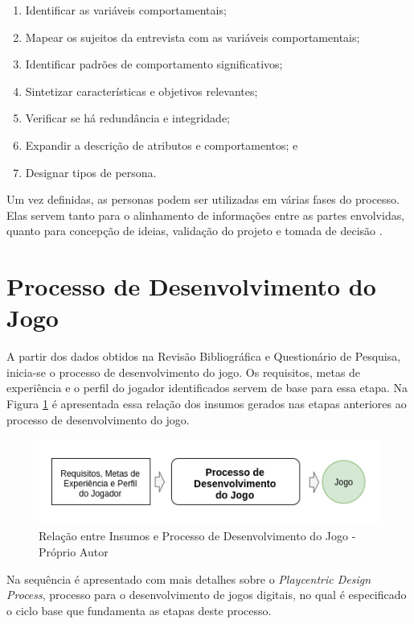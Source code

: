 \begin{enumerate}
    \item Identificar as variáveis comportamentais;
    \item Mapear os sujeitos da entrevista com as variáveis comportamentais;
    \item Identificar padrões de comportamento significativos;
    \item Sintetizar características e objetivos relevantes;
    \item Verificar se há redundância e integridade;
    \item Expandir a descrição de atributos e comportamentos; e
    \item Designar tipos de persona.
\end{enumerate}

Um vez definidas, as personas podem ser utilizadas em várias fases do processo. Elas servem tanto para o alinhamento de informações entre as partes envolvidas, quanto para concepção de ideias, validação do projeto e tomada de decisão \cite[p. 80]{Vianna_2014}. %

\section{Processo de Desenvolvimento do Jogo}

A partir dos dados obtidos na Revisão Bibliográfica e Questionário de Pesquisa, inicia-se o processo de desenvolvimento do jogo. Os requisitos, metas de experiência e o perfil do jogador identificados servem de base para essa etapa. Na Figura \ref{Fig:overview-process.png} é apresentada essa relação dos insumos gerados nas etapas anteriores ao processo de desenvolvimento do jogo.

\begin{figure}[htbp]
	\centering
		\includegraphics[keepaspectratio=true,scale=0.65]{figuras/overview-process.png}
	\caption{Relação entre Insumos e Processo de Desenvolvimento do Jogo - Próprio Autor}
	\label{Fig:overview-process.png}
\end{figure}

Na sequência é apresentado com mais detalhes sobre o \textit{Playcentric Design Process}, processo para o desenvolvimento de jogos digitais, no qual é especificado o ciclo base que fundamenta as etapas deste processo.

